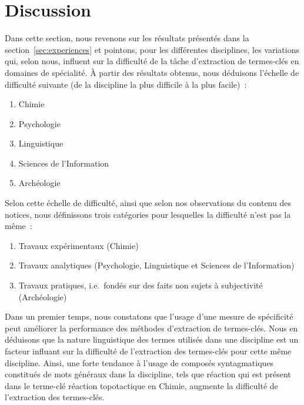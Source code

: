 \section{Discussion}
\label{sec:discussion}
  Dans cette section, nous revenons sur les résultats présentés dans la
  section~\ref{sec:experiences} et pointons, pour les différentes disciplines,
  les variations qui, selon nous, influent sur la difficulté de la tâche
  d'extraction de termes-clés en domaines de spécialité. À partir des résultats
  obtenus, nous déduisons l'échelle de difficulté suivante (de la discipline la
  plus difficile à la plus facile)~:
  \begin{enumerate}
    \item{Chimie}
    \item{Psychologie}
    \item{Linguistique}
    \item{Sciences de l'Information}
    \item{Archéologie}
  \end{enumerate}
  Selon cette échelle de difficulté, ainsi que selon nos observations du contenu
  des notices, nous définissons trois catégories pour lesquelles la difficulté
  n'est pas la même~:
  \begin{enumerate}
    \item{Travaux expérimentaux (Chimie)}
    \item{Travaux analytiques (Psychologie, Linguistique et Sciences de
          l'Information)}
    \item{Travaux pratiques, i.e.~fondés sur des faits non sujets à subjectivité
          (Archéologie)}
  \end{enumerate}

  Dans un premier temps, nous constatons que l'usage d'une mesure de spécificité
  peut améliorer la performance des méthodes d'extraction de termes-clés. Nous
  en déduisons que la nature linguistique des termes utilisés dans une
  discipline est un facteur influant sur la difficulté de l'extraction des
  termes-clés pour cette même discipline. Ainsi, une forte tendance à l'usage de
  composés syntagmatiques constitués de mots généraux dans la discipline, tels
  que \og{}réaction\fg{} qui est présent dans le terme-clé \og{}réaction
  topotactique\fg{} en Chimie, augmente la difficulté de l'extraction des
  termes-clés.

